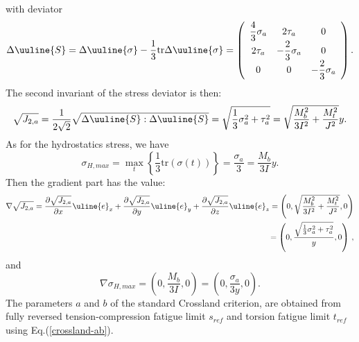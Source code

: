 with deviator
\begin{equation} 
	\Delta\uuline{ S}=\Delta\uuline{\sigma}-\dfrac{1}{3}\textrm{tr}\Delta\uuline{\sigma}=
	\left(
	\begin{array}{ccc}
		\dfrac{4}{3}\sigma_{a} & 2\tau_a & 0\\
		2\tau_a & -\dfrac{2}{3}\sigma_a & 0\\ 
		0 & 0 & -\dfrac{2}{3}\sigma_a\\
	\end{array}\right) .
\end{equation}
The second invariant of the stress deviator is then:
\begin{equation}
	\sqrt{J_{2,a}}=\dfrac{1}{2\sqrt{2}}\sqrt{\Delta \uuline{S}:\Delta \uuline{S}}=\sqrt{\dfrac{1}{3}\sigma_a^2+\tau_a^2}=\sqrt{\dfrac{M_b^2}{3I^2}+\dfrac{M_t^2}{J^2}}y.
\end{equation}
As for the  hydrostatics stress, we have
\begin{equation}
	\sigma_{H,max}=\max\limits_{t}\left\lbrace \dfrac{1}{3}\textrm{tr}(\sigma(t))\right\rbrace =\dfrac{\sigma_{a}}{3}=\dfrac{M_b}{3I}y .
\end{equation}
Then the gradient part has the value:
\begin{equation}
	\begin{split}
		\nabla\sqrt{J_{2,a}}=\dfrac{\partial\sqrt{J_{2,a}}}{\partial x}\uline{e}_x+\dfrac{\partial\sqrt{J_{2,a}}}{\partial y}\uline{e}_y+\dfrac{\partial\sqrt{J_{2,a}}}{\partial z}\uline{e}_z=\left( 0,\sqrt{\dfrac{M_b^2}{3I^2}+\dfrac{M_t^2}{J^2}},0\right) \\=\left( 0,\dfrac{\sqrt{\frac{1}{3}\sigma_a^2+\tau_a^2}}{y},0\right) \, ,
	\end{split}
\end{equation}
and
\begin{equation}
	\nabla \sigma_{H,max}=\left( 0,\dfrac{M_b}{3I},0\right) =\left( 0,\dfrac{\sigma_a}{3y},0\right) .
\end{equation}
The parameters $a$ and $b$ of the standard Crossland criterion, are obtained from fully reversed tension-compression fatigue limit $s_{ref}$  and torsion fatigue limit $t_{ref}$ using Eq.(\ref{crossland-ab}).

